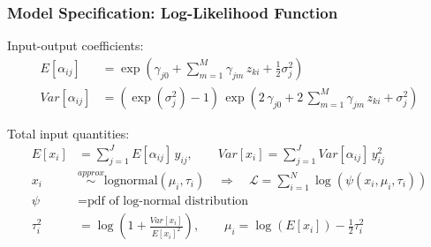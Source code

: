 \documentclass[t,24pt,aspectratio=169]{beamer}
\begin{document}
\begin{frame}[hvid]
\frametitle{\vspace{-3ex}Model Specification: Log-Likelihood Function}
\vspace{-1ex}

Input-output coefficients:\\[-5ex]
\begin{align*}
E[ \alpha_{ij} ] 
& = \exp \left( \gamma_{j0} 
+ \sum_{m=1}^M \gamma_{jm} \, z_{ki} + \frac{1}{2} \sigma_j^2 \right) \\
Var[ \alpha_{ij} ] 
& =
\left( \exp (\sigma_j^2 ) - 1 \right) \,
\exp \left( 2 \, \gamma_{j0} 
+ 2 \, \sum_{m=1}^M \gamma_{jm} \, z_{ki} + \sigma_j^2 \right)
\end{align*}

\vspace{-2ex}

Total input quantities:\\[-5ex]
\begin{align*}
E[ x_i ] 
& = \sum_{j=1}^J  E[ \alpha_{ij} ]  \, y_{ij}, \qquad
Var[ x_i ] 
 = \sum_{j=1}^J  Var[ \alpha_{ij} ]  \, y_{ij}^2\\[-2ex]
x_i
& \stackrel{approx}{\sim} \text{lognormal} \left( \mu_i , \tau_i \right)
\quad \Rightarrow \quad
\mathcal{L} = \sum_{i=1}^N \log \left( \psi\left( x_i, \mu_i, \tau_i \right) \right)\\[-2ex]
\psi & = \text{pdf of log-normal distribution}\\[-0ex]
\tau_i^2
& = \log \left( 1 + \frac{Var[x_i]}{E[x_i]^2} \right),
\qquad
\mu_i = \log \left( E[ x_i ] \right) - \frac{1}{2} \tau_i^2
\end{align*}
\end{frame}
\end{document}

